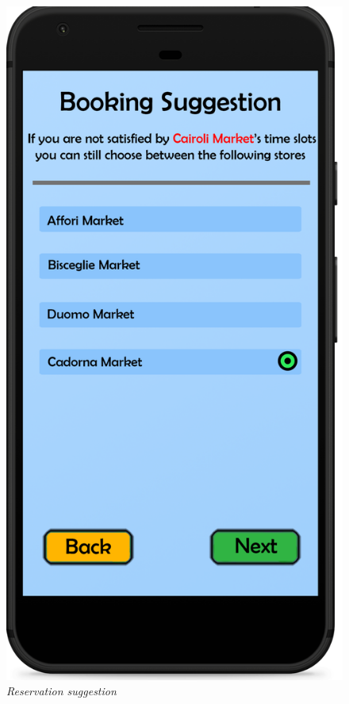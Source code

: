 \documentclass{article}
\begin{document}
\begin{figure}[!h]
\begin{minipage}[!h]{0.4\textwidth}
			\end{minipage}
			\hfill
			\begin{minipage}[!h]{0.4\textwidth}
				\includegraphics[width=\textwidth]{../Mockups/BookingSuggestion.png}
				\caption{\emph{Reservation suggestion}}
			\end{minipage}
		\end{figure}
	
\end{document}
